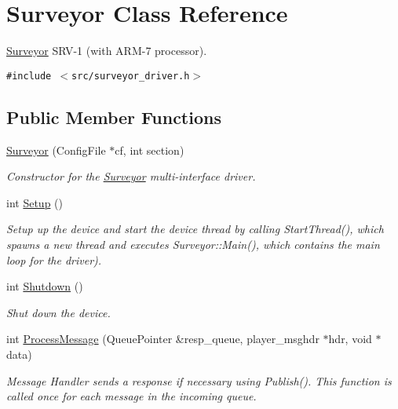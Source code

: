 \hypertarget{classSurveyor}{
\section{Surveyor Class Reference}
\label{classSurveyor}
}
\hyperlink{classSurveyor}{Surveyor} SRV-1 (with ARM-7 processor).  


{\tt \#include $<$src/surveyor\_\-driver.h$>$}

\subsection*{Public Member Functions}
\begin{CompactItemize}
\item 
\hyperlink{classSurveyor_b0792137ec4760d15de63856ebeb7464}{Surveyor} (ConfigFile $\ast$cf, int section)
\begin{CompactList}\small\item\em Constructor for the \hyperlink{classSurveyor}{Surveyor} multi-interface driver. \item\end{CompactList}\item 
int \hyperlink{classSurveyor_c127d6028c08790fe79902b1b8359468}{Setup} ()
\begin{CompactList}\small\item\em Setup up the device and start the device thread by calling StartThread(), which spawns a new thread and executes Surveyor::Main(), which contains the main loop for the driver). \item\end{CompactList}\item 
int \hyperlink{classSurveyor_cfe0180d05f0a34474a75cdfd87b1a81}{Shutdown} ()
\begin{CompactList}\small\item\em Shut down the device. \item\end{CompactList}\item 
int \hyperlink{classSurveyor_9af107b9b363d15951303c3cbaf4328f}{ProcessMessage} (QueuePointer \&resp\_\-queue, player\_\-msghdr $\ast$hdr, void $\ast$data)
\begin{CompactList}\small\item\em Message Handler sends a response if necessary using Publish(). This function is called once for each message in the incoming queue. \item\end{CompactList}\end{CompactItemize}


